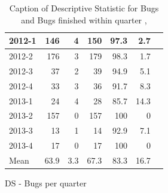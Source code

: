 \documentclass[UKenglish]{ifimaster}  %
\begin{document}
\begin{appendices}
\begin{table}[!htbp]
\begin{adjustwidth}{-1.5cm}{}
\begin{subfigure}[b]{0.3\textwidth}
{\begin{tabular}{ | l | r | r | r | r | r | r | }
2012-1 & 146 & 4 & 150 & 97.3 & 2.7 \\ \hline
2012-2 & 176 & 3 & 179 & 98.3& 1.7 \\ \hline
2012-3 & 37 & 2 & 39 & 94.9& 5.1\\ \hline
2012-4 & 33 & 3 & 36 & 91.7 & 8.3 \\ \hline
2013-1 & 24 & 4 & 28 & 85.7 & 14.3 \\ \hline
2013-2 & 157 & 0 & 157 & 100 & 0 \\ \hline
2013-3 & 13 & 1 & 14 & 92.9& 7.1 \\ \hline
2013-4 & 17 & 0 & 17 & 100 & 0 \\ \hline
Mean & 63.9&3.3&67.3&83.3&16.7\\ \hline
\end{tabular}
}
\caption{DS - Bugs per quarter}
\label{DS:FTPQ:1}
\end{subfigure}
\end{adjustwidth}
\caption[Optional caption for list of figures]{Caption of Descriptive Statistic for Bugs and Bugs finished within quarter  , }
\label{DS:1:5} %
\end{table}
 
 
 

\end{appendices}
\end{document}
